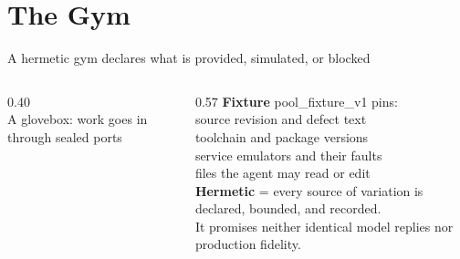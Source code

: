 \documentclass[aspectratio=169, 12pt]{beamer}
\begin{document}
\section{The Gym}

\begin{frame}{A hermetic gym declares what is provided, simulated, or blocked}
  \begin{columns}[c]
    \begin{column}{0.40\textwidth}
      \centering{}\\[0.03cm]
      {\footnotesize A glovebox: work goes in through sealed ports}
    \end{column}
    \begin{column}{0.57\textwidth}
      \small
      \textbf{Fixture} pool\_fixture\_v1 pins:\\[0.05cm]
      \hspace*{0.3cm}source revision and defect text\\
      \hspace*{0.3cm}toolchain and package versions\\
      \hspace*{0.3cm}service emulators and their faults\\
      \hspace*{0.3cm}files the agent may read or edit\\[0.2cm]
      \textbf{Hermetic} = every source of variation is declared, bounded, and recorded.\\[0.15cm]
      \textcolor{midgray}{It promises neither identical model replies nor production fidelity.}
    \end{column}
  \end{columns}
\end{frame}
\end{document}

